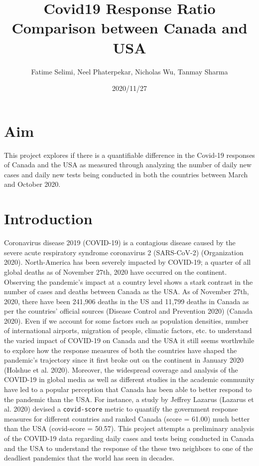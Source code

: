 \documentclass[
]{article}
\title{Covid19 Response Ratio Comparison between Canada and USA}
\author{Fatime Selimi, Neel Phaterpekar, Nicholas Wu, Tanmay Sharma}
\date{2020/11/27}
\begin{document}
\maketitle

{
\setcounter{tocdepth}{2}
\tableofcontents
}
\hypertarget{aim}{%
\section{Aim}\label{aim}}

This project explores if there is a quantifiable difference in the
Covid-19 responses of Canada and the USA as measured through analyzing
the number of daily new cases and daily new tests being conducted in
both the countries between March and October 2020.

\hypertarget{introduction}{%
\section{Introduction}\label{introduction}}

Coronavirus disease 2019 (COVID-19) is a contagious disease caused by
the severe acute respiratory syndrome coronavirus 2 (SARS-CoV-2)
(Organization 2020). North-America has been severely impacted by
COVID-19; a quarter of all global deaths as of November 27th, 2020 have
occurred on the continent. Observing the pandemic's impact at a country
level shows a stark contrast in the number of cases and deaths between
Canada as the USA. As of November 27th, 2020, there have been 241,906
deaths in the US and 11,799 deaths in Canada as per the countries'
official sources (Disease Control and Prevention 2020) (Canada 2020).
Even if we account for some factors such as population densities, number
of international airports, migration of people, climatic factors, etc.
to understand the varied impact of COVID-19 on Canada and the USA it
still seems worthwhile to explore how the response measures of both the
countries have shaped the pandemic's trajectory since it first broke out
on the continent in January 2020 (Holshue et al. 2020). Moreover, the
widespread coverage and analysis of the COVID-19 in global media as well
as different studies in the academic community have led to a popular
perception that Canada has been able to better respond to the pandemic
than the USA. For instance, a study by Jeffrey Lazarus (Lazarus et al.
2020) devised a \texttt{covid-score} metric to quantify the government
response measures for different countries and ranked Canada (score =
61.00) much better than the USA (covid-score = 50.57). This project
attempts a preliminary analysis of the COVID-19 data regarding daily
cases and tests being conducted in Canada and the USA to understand the
response of the these two neighbors to one of the deadliest pandemics
that the world has seen in decades.
\end{document}

